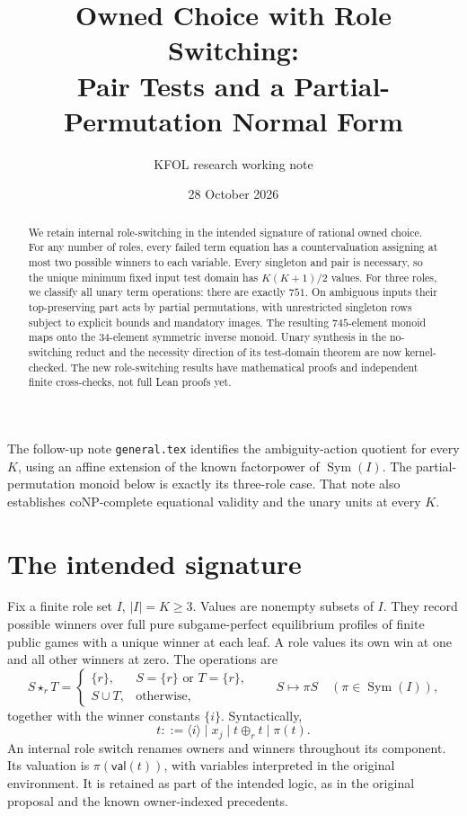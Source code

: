 \documentclass[11pt]{article}
\title{Owned Choice with Role Switching:\\Pair Tests and a Partial-Permutation Normal Form}
\author{KFOL research working note}
\date{28 October 2026}
\newcommand{\ow}[1]{\mathbin{\star_{#1}}}
\begin{document}
\maketitle
\begin{abstract}
We retain internal role-switching in the intended signature of rational
owned choice. For any number of roles, every failed term equation has a
countervaluation assigning at most two possible winners to each variable.
Every singleton and pair is necessary, so the unique minimum fixed input
test domain has $K(K+1)/2$ values. For three roles, we classify all unary
term operations: there are exactly $751$. On ambiguous inputs their
top-preserving part acts by partial permutations, with unrestricted
singleton rows subject to explicit bounds and mandatory images. The
resulting $745$-element monoid maps onto the $34$-element symmetric inverse
monoid. Unary synthesis in the no-switching reduct and the necessity
direction of its test-domain theorem are now kernel-checked. The new
role-switching results have mathematical proofs and independent finite
cross-checks, not full Lean proofs yet.
\end{abstract}

The follow-up note \texttt{general.tex} identifies the ambiguity-action
quotient for every $K$, using an affine extension of the known
factorpower of $\operatorname{Sym}(I)$. The partial-permutation monoid
below is exactly its three-role case. That note also establishes
coNP-complete equational validity and the unary units at every $K$.

\section{The intended signature}

Fix a finite role set $I$, $|I|=K\geq3$. Values are nonempty subsets of
$I$. They record possible winners over full pure subgame-perfect
equilibrium profiles of finite public games with a unique winner at
each leaf. A role values its own win at one and all other winners at
zero. The operations are
\[
 S\ow r T=\begin{cases}\{r\},&S=\{r\}\text{ or }T=\{r\},\\
 S\cup T,&\text{otherwise},\end{cases}
 \qquad S\longmapsto\pi S\quad(\pi\in\operatorname{Sym}(I)),
\]
together with the winner constants $\{i\}$. Syntactically,
\[
 t ::= \langle i\rangle\mid x_j\mid t\oplus_r t\mid\pi(t).
\]
An internal role switch renames owners and winners throughout its
component. Its valuation is $\pi(\mathsf{val}(t))$, with variables
interpreted in the original environment. It is retained as part of the
intended logic, as in the original proposal and the known owner-indexed
precedents\cite{Abramsky2007,OldeLoohuisVenema2010}.
\end{document}
